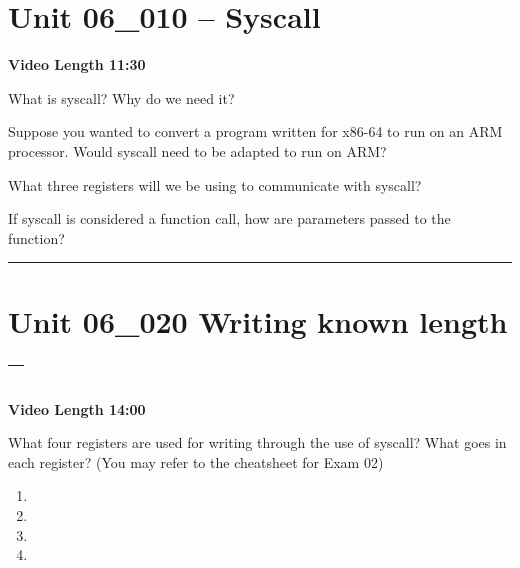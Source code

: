 \documentclass[letterpaper,12pt]{exam}
\newcommand{\unit}{Unit 06}
\begin{document}
\begin{questions}
\section*{\unit\_010 -- Syscall}
\par{\selectfont\textbf{Video Length 11:30}}
\begin{samepage}
    \question What is syscall?  Why do we need it?
    \vspace{5mm}
\end{samepage}
\par
\begin{samepage}
    \question Suppose you wanted to convert a program written for x86-64 to run on an ARM processor.  Would syscall need to be adapted to run on ARM?
    \vspace{5mm}
\end{samepage}
\par
 \begin{samepage}
     \question What three registers will we be using to communicate with syscall?
     \vspace{5mm}
 \end{samepage}
 \par
 \begin{samepage}
     \question If syscall is considered a function call, how are parameters passed to the function?
     \vspace{5mm}
 \end{samepage}
 \par
   
\rule{0.5\textwidth}{.4pt} %
\section*{\unit\_020 Writing known length -- }
\par{\selectfont\textbf{Video Length 14:00}}
\begin{samepage}
    \question What four registers are used for writing through the use of syscall?  What goes in each register? (You may refer to the cheatsheet for Exam 02)
    \begin{enumerate}
        \item 
        \vspace{5mm}
        \item 
        \vspace{5mm}
        \item 
        \vspace{5mm}
        \item 
        \vspace{5mm}
    \end{enumerate}
    \vspace{5mm}
\end{samepage}
\par


\end{questions}
\end{document}
